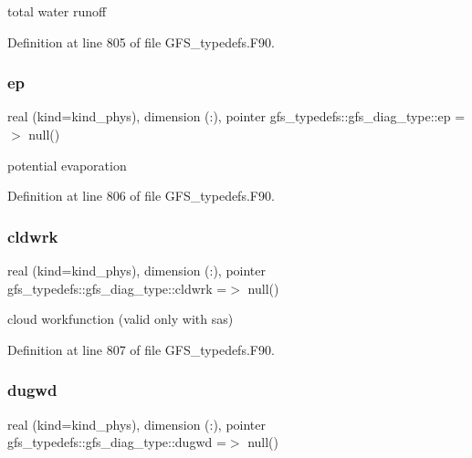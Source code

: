 total water runoff 



Definition at line 805 of file G\+F\+S\+\_\+typedefs.\+F90.

\mbox{\label{structgfs__typedefs_1_1gfs__diag__type_a0ed66b85b65ae46b88b3e2d4523f7b0d}} 
\subsubsection{ep}
{\footnotesize\ttfamily real (kind=kind\+\_\+phys), dimension     (\+:), pointer gfs\+\_\+typedefs\+::gfs\+\_\+diag\+\_\+type\+::ep =$>$ null()}



potential evaporation 



Definition at line 806 of file G\+F\+S\+\_\+typedefs.\+F90.

\mbox{\label{structgfs__typedefs_1_1gfs__diag__type_a49087c17a68981b3c1a113d508876a26}} 
\subsubsection{cldwrk}
{\footnotesize\ttfamily real (kind=kind\+\_\+phys), dimension (\+:), pointer gfs\+\_\+typedefs\+::gfs\+\_\+diag\+\_\+type\+::cldwrk =$>$ null()}



cloud workfunction (valid only with sas) 



Definition at line 807 of file G\+F\+S\+\_\+typedefs.\+F90.

\mbox{\label{structgfs__typedefs_1_1gfs__diag__type_a2d81dab2f5f1766de72a5f175f71b63e}} 
\subsubsection{dugwd}
{\footnotesize\ttfamily real (kind=kind\+\_\+phys), dimension  (\+:), pointer gfs\+\_\+typedefs\+::gfs\+\_\+diag\+\_\+type\+::dugwd =$>$ null()}



